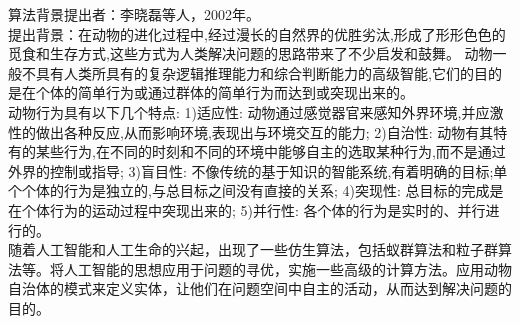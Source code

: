 \documentclass[UTF8]{ctexart}
\begin{document}
\newpage
\setcounter{page}{1}
\begin{section}
{算法背景}提出者：李晓磊等人，2002年。\\
提出背景：在动物的进化过程中,经过漫长的自然界的优胜劣汰,形成了形形色色的觅食和生存方式,这些方式为人类解决问题的思路带来了不少启发和鼓舞。 动物一般不具有人类所具有的复杂逻辑推理能力和综合判断能力的高级智能,它们的目的是在个体的简单行为或通过群体的简单行为而达到或突现出来的。\\动物行为具有以下几个特点: 1)适应性: 动物通过感觉器官来感知外界环境,并应激性的做出各种反应,从而影响环境,表现出与环境交互的能力; 2)自治性: 动物有其特有的某些行为,在不同的时刻和不同的环境中能够自主的选取某种行为,而不是通过外界的控制或指导; 3)盲目性: 不像传统的基于知识的智能系统,有着明确的目标;单个个体的行为是独立的,与总目标之间没有直接的关系; 4)突现性: 总目标的完成是在个体行为的运动过程中突现出来的; 5)并行性: 各个体的行为是实时的、并行进行的。\\随着人工智能和人工生命的兴起，出现了一些仿生算法，包括蚁群算法和粒子群算法等。将人工智能的思想应用于问题的寻优，实施一些高级的计算方法。应用动物自治体的模式来定义实体，让他们在问题空间中自主的活动，从而达到解决问题的目的。
\end{section}
\end{document}
